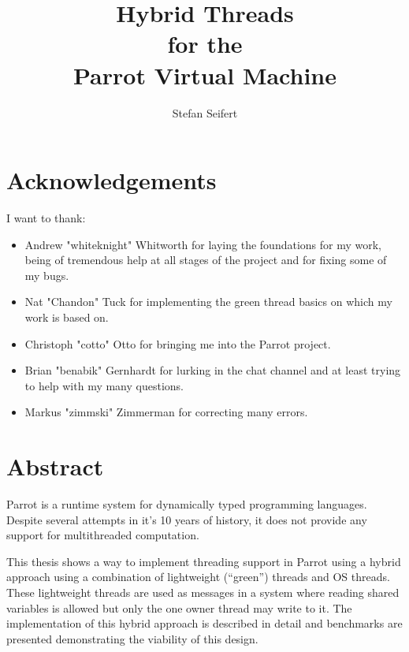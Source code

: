 \documentclass[bachelor,english]{hgbthesis}
\begin{document}
\title{Hybrid Threads \\ for the \\ Parrot Virtual Machine}

\author{Stefan Seifert}


\frontmatter
\maketitle
\tableofcontents

\chapter{Acknowledgements}

I want to thank:
\begin{itemize}
\item{Andrew "whiteknight" Whitworth for laying the foundations for my work, being of tremendous help at all stages of the project and for fixing some of my bugs.}
\item{Nat "Chandon" Tuck for implementing the green thread basics on which my work is based on.}
\item{Christoph "cotto" Otto for bringing me into the Parrot project.}
\item{Brian "benabik" Gernhardt for lurking in the chat channel and at least trying to help with my many questions.}
\item{Markus "zimmski" Zimmerman for correcting many errors.}
\end{itemize}

\chapter{Abstract}

Parrot is a runtime system for dynamically typed programming languages. Despite several attempts in it's 10 years of history, it does not provide any support for multithreaded computation.

This thesis shows a way to implement threading support in Parrot using a hybrid approach using a combination of lightweight (``green'') threads and OS threads. These lightweight threads are used as messages in a system where reading shared variables is allowed but only the one owner thread may write to it. The implementation of this hybrid approach is described in detail and benchmarks are presented demonstrating the viability of this design.
\end{document}
